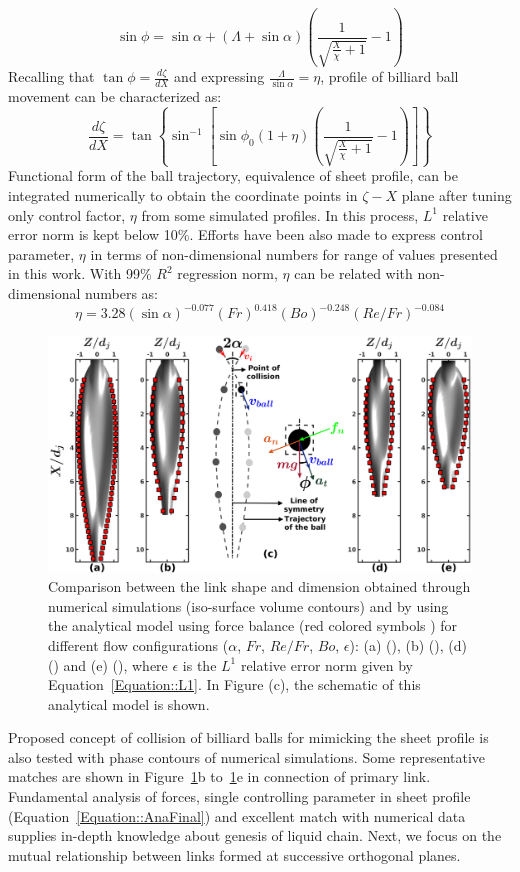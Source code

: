 \documentclass{jfm}
\begin{document}
\begin{equation}
\sin\phi  = \sin\alpha + \left(\Lambda + \sin\alpha\right)\left(\frac{1}{\sqrt{\frac{X}{\chi} + 1}} - 1\right)	
\end{equation}
Recalling that $\tan\phi = \frac{d\zeta}{dX}$ and expressing $\frac{\Lambda}{\sin\alpha} = \eta$, profile of billiard ball movement can be characterized as:
\begin{equation}
\label{Equation::AnaFinal}
\frac{d\zeta}{dX} = \tan\left\lbrace\sin^{-1}\left[ \sin\phi_0\left(1 + \eta\right)\left(\frac{1}{\sqrt{\frac{X}{\chi} + 1}} - 1\right) \right]\right\rbrace
\end{equation}
Functional form of the ball trajectory, equivalence of sheet profile, can be integrated numerically to obtain the coordinate points in $\zeta-X$ plane after tuning only control factor, $\eta$ from some simulated profiles. In this process, $L^1$ relative error norm is kept below 10\%. Efforts have been also made to express control parameter, $\eta$ in terms of non-dimensional numbers for range of values presented in this work. With 99\% $R^2$ regression norm, $\eta$ can be related with non-dimensional numbers as:
\begin{equation}\label{Equation::eta}
\eta = 3.28(\sin\alpha)^{-0.077}(Fr)^{0.418}(Bo)^{-0.248}\left(Re/Fr\right)^{-0.084}
\end{equation}
\begin{figure}
	\centering
	\includegraphics[width=\linewidth]{Figure7}
	\caption{Comparison between the link shape and dimension obtained through numerical simulations (iso-surface volume contours) and by using the analytical model using force balance (red colored symbols \protect\MarkerSquareRed) for different flow configurations ($\alpha$, $Fr$, $Re/Fr$, $Bo$, $\epsilon$): (a) (), (b) (), (d) () and (e) (), where $\epsilon$ is the $L^1$ relative error norm given by Equation~\ref{Equation::L1}. In Figure (c), the schematic of this analytical model is shown.}
	\label{Figure::analytical}
\end{figure}
Proposed concept of collision of billiard balls for mimicking the sheet profile is also tested with phase contours of numerical simulations. Some representative matches are shown in Figure~\ref{Figure::analytical}b to~\ref{Figure::analytical}e in connection of primary link. Fundamental analysis of forces, single controlling parameter in sheet profile (Equation~\ref{Equation::AnaFinal}) and excellent match with numerical data supplies in-depth knowledge about genesis of liquid chain. Next, we focus on the mutual relationship between links formed at successive orthogonal planes. 
\end{document}
